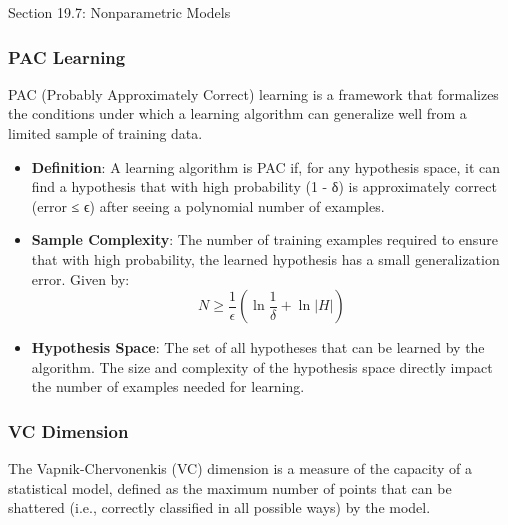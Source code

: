 \begin{notes}{Section 19.7: Nonparametric Models}
\begin{highlight}
    \end{highlight}
    
    \subsubsection*{PAC Learning}
    
    PAC (Probably Approximately Correct) learning is a framework that formalizes the conditions under which a learning algorithm can generalize well from a limited sample of training data.
    
    \begin{highlight}
    
        \begin{itemize}
            \item \textbf{Definition}: A learning algorithm is PAC if, for any hypothesis space, it can find a hypothesis that with high probability (1 - δ) is approximately correct (error ≤ ϵ) after seeing a 
            polynomial number of examples.
            \item \textbf{Sample Complexity}: The number of training examples required to ensure that with high probability, the learned hypothesis has a small generalization error. Given by:
            \[
            N \geq \frac{1}{\epsilon} \left( \ln \frac{1}{\delta} + \ln |H| \right)
            \]
            \item \textbf{Hypothesis Space}: The set of all hypotheses that can be learned by the algorithm. The size and complexity of the hypothesis space directly impact the number of examples needed 
            for learning.
        \end{itemize}
    
    \end{highlight}
    
    \subsubsection*{VC Dimension}
    
    The Vapnik-Chervonenkis (VC) dimension is a measure of the capacity of a statistical model, defined as the maximum number of points that can be shattered (i.e., correctly classified in all possible ways) 
    by the model.
    
    \begin{highlight}[VC Dimension]
    

\end{highlight}
\end{notes}
